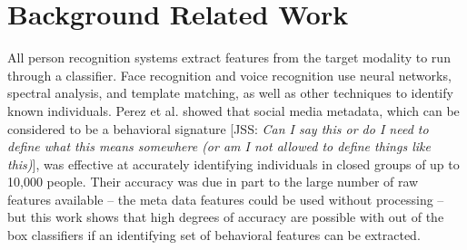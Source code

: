 \documentclass[conference]{IEEEtran}
\newcommand{\meta}[1]{{\textcolor[rgb]{0.1,0.7,0.2}{[JSS: {\it #1}]}}}
\begin{document}









\section{Background Related Work}

All person recognition systems extract features from the target modality to run through a classifier. Face recognition \cite{tolba2006face} and voice recognition \cite{beigi2011speaker} use neural networks, spectral analysis, and template matching, as well as other techniques to identify known individuals. Perez et al. showed that social media metadata, which can be considered to be a behavioral signature \meta{Can I say this or do I need to define what this means somewhere (or am I not allowed to define things like this)}, was effective at accurately identifying individuals in closed groups of up to 10,000 people. Their accuracy was due in part to the large number of raw features available -- the meta data features could be used without processing -- but this work shows that high degrees of accuracy are possible with out of the box classifiers if an identifying set of behavioral features can be extracted. 
\end{document}
